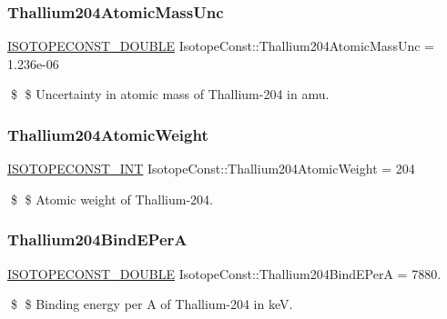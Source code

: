 \subsubsection{\texorpdfstring{Thallium204\+Atomic\+Mass\+Unc}{Thallium204AtomicMassUnc}}
{\footnotesize\ttfamily \mbox{\hyperlink{group___isotope_const-_macros_ga8f45a7272ce02c0b4c65c44636ed719a}{I\+S\+O\+T\+O\+P\+E\+C\+O\+N\+S\+T\+\_\+\+D\+O\+U\+B\+LE}} Isotope\+Const\+::\+Thallium204\+Atomic\+Mass\+Unc = 1.\+236e-\/06}

\$ \$ Uncertainty in atomic mass of Thallium-\/204 in amu. \mbox{\label{group___isotope_const-_thallium-_tl204_gafe7535e51f3bd8afb775a5137766660d}} 
\subsubsection{\texorpdfstring{Thallium204\+Atomic\+Weight}{Thallium204AtomicWeight}}
{\footnotesize\ttfamily \mbox{\hyperlink{group___isotope_const-_macros_ga5f18360b3e99483a35c32d789e62621c}{I\+S\+O\+T\+O\+P\+E\+C\+O\+N\+S\+T\+\_\+\+I\+NT}} Isotope\+Const\+::\+Thallium204\+Atomic\+Weight = 204}

\$ \$ Atomic weight of Thallium-\/204. \mbox{\label{group___isotope_const-_thallium-_tl204_ga84ee72be2b9ab4c1556cfea0077c0e99}} 
\subsubsection{\texorpdfstring{Thallium204\+Bind\+E\+PerA}{Thallium204BindEPerA}}
{\footnotesize\ttfamily \mbox{\hyperlink{group___isotope_const-_macros_ga8f45a7272ce02c0b4c65c44636ed719a}{I\+S\+O\+T\+O\+P\+E\+C\+O\+N\+S\+T\+\_\+\+D\+O\+U\+B\+LE}} Isotope\+Const\+::\+Thallium204\+Bind\+E\+PerA = 7880.}

\$ \$ Binding energy per A of Thallium-\/204 in keV. \mbox{\label{group___isotope_const-_thallium-_tl204_ga388cef80a9c4d0c931128898da637b23}} 
